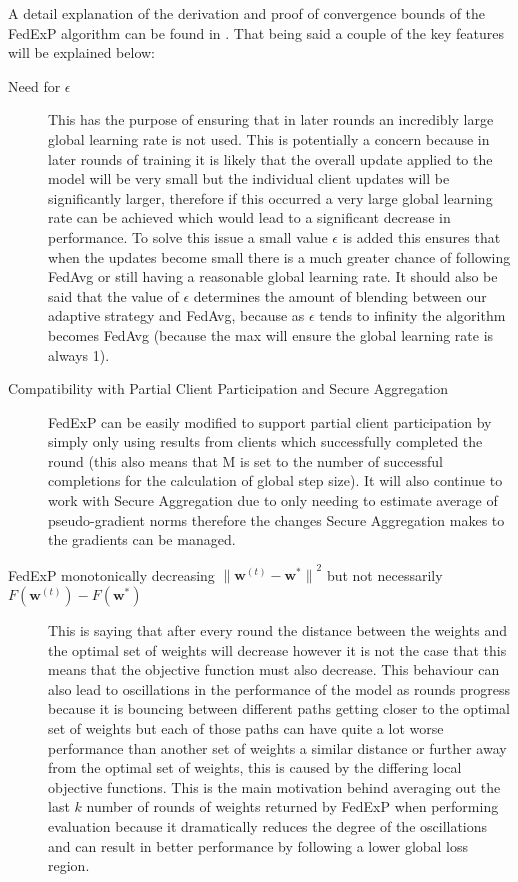 \documentclass{article}
\begin{document}
A detail explanation of the derivation and proof of convergence bounds of the FedExP algorithm can be found in \cite{FedExP}.  That being said a couple of the key features will be explained below:

\begin{description}
\item[Need for $\epsilon$]{This has the purpose of ensuring that in later rounds an incredibly large global learning rate is not used.  This is potentially a concern because in later rounds of training it is likely that the overall update applied to the model will be very small but the individual client updates will be significantly larger, therefore if this occurred a very large global learning rate can be achieved which would lead to a significant decrease in performance.  To solve this issue a small value $\epsilon$ is added this ensures that when the updates become small there is a much greater chance of following FedAvg or still having a reasonable global learning rate.  It should also be said that the value of $\epsilon$ determines the amount of blending between our adaptive strategy and FedAvg, because as $\epsilon$ tends to infinity the algorithm becomes FedAvg (because the max will ensure the global learning rate is always 1).}

\item[Compatibility with Partial Client Participation and Secure Aggregation]{FedExP can be easily modified to support partial client participation by simply only using results from clients which successfully completed the round (this also means that M is set to the number of successful completions for the calculation of global step size).  It will also continue to work with Secure Aggregation due to only needing to estimate average of pseudo-gradient norms therefore the changes Secure Aggregation makes to the gradients can be managed.}

\item[FedExP monotonically decreasing ${\lVert\textbf{w}^{(t)} - \textbf{w}^*\rVert}^2$ but not necessarily $F(\textbf{w}^{(t)}) - F(\textbf{w}^*)$]{This is saying that after every round the distance between the weights and the optimal set of weights will decrease however it is not the case that this means that the objective function must also decrease.  This behaviour can also lead to oscillations in the performance of the model as rounds progress because it is bouncing between different paths getting closer to the optimal set of weights but each of those paths can have quite a lot worse performance than another set of weights a similar distance or further away from the optimal set of weights, this is caused by the differing local objective functions.  This is the main motivation behind averaging out the last $k$ number of rounds of weights returned by FedExP when performing evaluation because it dramatically reduces the degree of the oscillations and can result in better performance by following a lower global loss region.}

\end{description}
\end{document}
